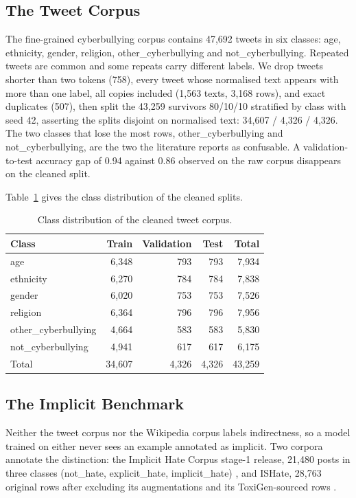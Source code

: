 \subsection{The Tweet Corpus}
\label{sec:4.1}
The fine-grained cyberbullying corpus \cite{wang2020sosnet} contains 47,692 tweets in six classes:
age, ethnicity, gender, religion, other\_cyberbullying and not\_cyberbullying. Repeated tweets are
common and some repeats carry different labels. We drop tweets shorter than two tokens (758), every
tweet whose normalised text appears with more than one label, all copies included (1,563 texts,
3,168 rows), and exact duplicates (507), then split the 43,259 survivors 80/10/10 stratified by
class with seed 42, asserting the splits disjoint on normalised text: 34,607 / 4,326 / 4,326. The
two classes that lose the most rows, other\_cyberbullying and not\_cyberbullying, are the two the
literature reports as confusable. A validation-to-test accuracy gap of 0.94 against 0.86 observed on
the raw corpus disappears on the cleaned split.

Table~\ref{tab:classes} gives the class distribution of the cleaned splits.

\begin{table}[htbp]
\centering
\small
\caption{Class distribution of the cleaned tweet corpus.}
\label{tab:classes}
\begin{tabular}{lrrrr}
\toprule
Class & Train & Validation & Test & Total \\
\midrule
age & 6,348 & 793 & 793 & 7,934 \\
ethnicity & 6,270 & 784 & 784 & 7,838 \\
gender & 6,020 & 753 & 753 & 7,526 \\
religion & 6,364 & 796 & 796 & 7,956 \\
other\_cyberbullying & 4,664 & 583 & 583 & 5,830 \\
not\_cyberbullying & 4,941 & 617 & 617 & 6,175 \\
\midrule
Total & 34,607 & 4,326 & 4,326 & 43,259 \\
\bottomrule
\end{tabular}
\end{table}

\subsection{The Implicit Benchmark}
\label{sec:4.2}
Neither the tweet corpus nor the Wikipedia corpus labels indirectness, so a model trained on either
never sees an example annotated as implicit. Two corpora annotate the distinction: the Implicit Hate
Corpus stage-1 release, 21,480 posts in three classes (not\_hate, explicit\_hate, implicit\_hate)
\cite{elsherief2021latent}, and ISHate, 28,763 original rows after excluding its augmentations and
its ToxiGen-sourced rows \cite{ocampo2023indepth}.

